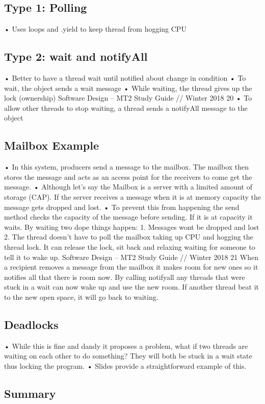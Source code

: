 \documentclass[11pt]{article}
\begin{document}
{{\subsection{Type 1: Polling}
• Uses loops and .yield to keep thread from hogging CPU
\subsection{Type 2: wait and notifyAll}
• Better to have a thread wait until notified about change in condition
• To wait, the object sends a wait message
• While waiting, the thread gives up the lock (ownership)
Software Design – MT2 Study Guide // Winter 2018 20
• To allow other threads to stop waiting, a thread sends a notifyAll message to the object
\subsection{Mailbox Example}
• In this system, producers send a message to the mailbox. The mailbox then stores the message and
acts as an access point for the receivers to come get the message.
• Although let’s say the Mailbox is a server with a limited amount of storage (CAP). If the server
receives a message when it is at memory capacity the message gets dropped and lost.
• To prevent this from happening the send method checks the capacity of the message before
sending. If it is at capacity it waits. By waiting two dope things happen: 1. Messages wont be dropped
and lost 2. The thread doesn't have to poll the mailbox taking up CPU and hogging the thread lock. It
can release the lock, sit back and relaxing waiting for someone to tell it to wake up. 
Software Design – MT2 Study Guide // Winter 2018 21
When a recipient removes a message from the mailbox it makes room for new ones so it notifies all that
there is room now. By calling notifyall any threads that were stuck in a wait can now wake up and use the
new room. If another thread beat it to the new open space, it will go back to waiting.
\subsection{Deadlocks}
• While this is fine and dandy it proposes a problem, what if two threads are waiting on each other to do
something? They will both be stuck in a wait state thus locking the program.
• Slides provide a straightforward example of this.
\subsection{Summary}

}}
\end{document}
